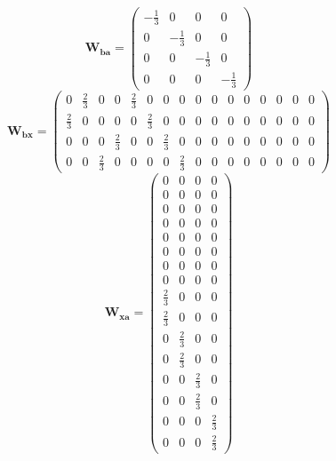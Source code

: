 \[ \mathbf{W_{ba}} = \left(\begin{smallmatrix} -\frac{1}{3} & 0 & 0 &
0 \\ 0 & -\frac{1}{3} & 0 & 0 \\ 0 & 0 & -\frac{1}{3} & 0 \\ 0 & 0 & 0
& -\frac{1}{3} \end{smallmatrix}\right) \]
\[ \mathbf{W_{bx}} = \left(\begin{smallmatrix} 0 & \frac{2}{3} & 0 & 0
& \frac{2}{3} & 0 & 0 & 0 & 0 & 0 & 0 & 0 & 0 & 0 & 0 & 0 \\
\frac{2}{3} & 0 & 0 & 0 & 0 & \frac{2}{3} & 0 & 0 & 0 & 0 & 0 & 0 & 0
& 0 & 0 & 0 \\ 0 & 0 & 0 & \frac{2}{3} & 0 & 0 & \frac{2}{3} & 0 & 0 &
0 & 0 & 0 & 0 & 0 & 0 & 0 \\ 0 & 0 & \frac{2}{3} & 0 & 0 & 0 & 0 &
\frac{2}{3} & 0 & 0 & 0 & 0 & 0 & 0 & 0 & 0 \end{smallmatrix}\right)
\]
\[ \mathbf{W_{xa}} = \left(\begin{smallmatrix} 0 & 0 & 0 & 0 \\ 0 & 0
& 0 & 0 \\ 0 & 0 & 0 & 0 \\ 0 & 0 & 0 & 0 \\ 0 & 0 & 0 & 0 \\ 0 & 0 &
0 & 0 \\ 0 & 0 & 0 & 0 \\ 0 & 0 & 0 & 0 \\ \frac{2}{3} & 0 & 0 & 0 \\
\frac{2}{3} & 0 & 0 & 0 \\ 0 & \frac{2}{3} & 0 & 0 \\ 0 & \frac{2}{3}
& 0 & 0 \\ 0 & 0 & \frac{2}{3} & 0 \\ 0 & 0 & \frac{2}{3} & 0 \\ 0 & 0
& 0 & \frac{2}{3} \\ 0 & 0 & 0 & \frac{2}{3} \end{smallmatrix}\right)
\]
